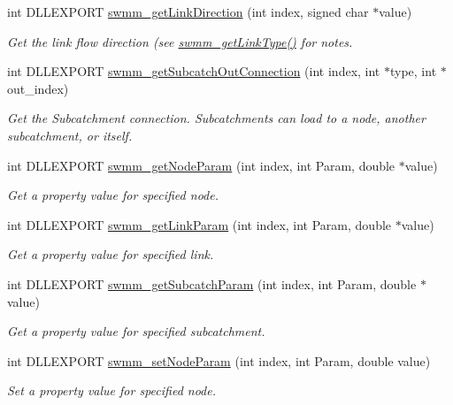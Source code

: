 \begin{DoxyCompactItemize}
int D\+L\+L\+E\+X\+P\+O\+RT \mbox{\hyperlink{group___network_info_gac390c83be7f7f0e2cd9c6f1126a226aa}{swmm\+\_\+get\+Link\+Direction}} (int index, signed char $\ast$value)
\begin{DoxyCompactList}\small\item\em Get the link flow direction (see \mbox{\hyperlink{group___network_info_gacf4d0ca8a3ced3c1b8797f3f09fff1d0}{swmm\+\_\+get\+Link\+Type()}} for notes. \end{DoxyCompactList}\item 
int D\+L\+L\+E\+X\+P\+O\+RT \mbox{\hyperlink{group___network_info_ga5bf84d942a741d62d12b87dbdb2c49b4}{swmm\+\_\+get\+Subcatch\+Out\+Connection}} (int index, int $\ast$type, int $\ast$out\+\_\+index)
\begin{DoxyCompactList}\small\item\em Get the Subcatchment connection. Subcatchments can load to a node, another subcatchment, or itself. \end{DoxyCompactList}\item 
int D\+L\+L\+E\+X\+P\+O\+RT \mbox{\hyperlink{group___network_info_ga90d0d4c48e2cbeaea1bd43ba095a6672}{swmm\+\_\+get\+Node\+Param}} (int index, int Param, double $\ast$value)
\begin{DoxyCompactList}\small\item\em Get a property value for specified node. \end{DoxyCompactList}\item 
int D\+L\+L\+E\+X\+P\+O\+RT \mbox{\hyperlink{group___network_info_gaab21d9f5a8789ab41c981a90e1240cc5}{swmm\+\_\+get\+Link\+Param}} (int index, int Param, double $\ast$value)
\begin{DoxyCompactList}\small\item\em Get a property value for specified link. \end{DoxyCompactList}\item 
int D\+L\+L\+E\+X\+P\+O\+RT \mbox{\hyperlink{group___network_info_ga20fcc911e1b6dbf4393a8e404d840963}{swmm\+\_\+get\+Subcatch\+Param}} (int index, int Param, double $\ast$value)
\begin{DoxyCompactList}\small\item\em Get a property value for specified subcatchment. \end{DoxyCompactList}\item 
int D\+L\+L\+E\+X\+P\+O\+RT \mbox{\hyperlink{group___network_info_gaa0bc371349ae8f593722e0c3bb0abf31}{swmm\+\_\+set\+Node\+Param}} (int index, int Param, double value)
\begin{DoxyCompactList}\small\item\em Set a property value for specified node. \end{DoxyCompactList}\item 

\end{DoxyCompactItemize}
